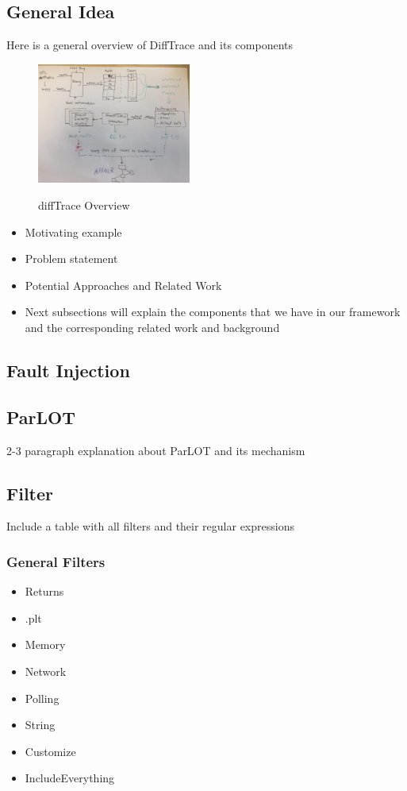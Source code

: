 \subsection{General Idea}

Here is a general overview of DiffTrace and its components

\begin{figure}[t]
\caption{diffTrace Overview}
\includegraphics[width=0.45\textwidth]{overviewSketch.jpg}
\label{fig.overview}
\end{figure}


\begin{itemize}
\item Motivating example 
\item Problem statement
\item Potential Approaches and Related Work
\item Next subsections will explain the components that we have in our framework and the corresponding related work and background
\end{itemize}
\subsection{Fault Injection}
\subsection{ParLOT}
2-3 paragraph explanation about ParLOT and its mechanism \cite{parlot}
\subsection{Filter}
Include a table with all filters and their regular expressions
\subsubsection{General Filters}
\begin{itemize}
\item Returns
\item .plt
\item Memory
\item Network
\item Polling
\item String
\item Customize
\item IncludeEverything
\end{itemize}
